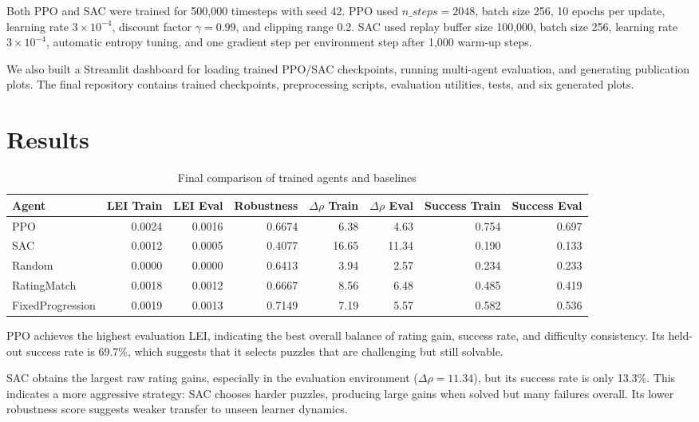 \documentclass[10pt,twocolumn]{article}
\begin{document}
Both PPO and SAC were trained for 500,000 timesteps with seed 42. PPO used
$n\_steps=2048$, batch size 256, 10 epochs per update, learning rate $3\times 10^{-4}$,
discount factor $\gamma=0.99$, and clipping range 0.2. SAC used replay buffer size
100,000, batch size 256, learning rate $3\times 10^{-4}$, automatic entropy tuning,
and one gradient step per environment step after 1,000 warm-up steps.

We also built a Streamlit dashboard for loading trained PPO/SAC checkpoints, running
multi-agent evaluation, and generating publication plots. The final repository
contains trained checkpoints, preprocessing scripts, evaluation utilities, tests, and
six generated plots.

\section{Results}

\begin{table}[t]
\centering
\caption{Final comparison of trained agents and baselines}
\begin{tabular}{lrrrrrrr}
\toprule
\textbf{Agent} &
\textbf{LEI Train} &
\textbf{LEI Eval} &
\textbf{Robustness} &
\textbf{$\Delta\rho$ Train} &
\textbf{$\Delta\rho$ Eval} &
\textbf{Success Train} &
\textbf{Success Eval} \\
\midrule
PPO & 0.0024 & 0.0016 & 0.6674 & 6.38 & 4.63 & 0.754 & 0.697 \\
SAC & 0.0012 & 0.0005 & 0.4077 & 16.65 & 11.34 & 0.190 & 0.133 \\
Random & 0.0000 & 0.0000 & 0.6413 & 3.94 & 2.57 & 0.234 & 0.233 \\
RatingMatch & 0.0018 & 0.0012 & 0.6667 & 8.56 & 6.48 & 0.485 & 0.419 \\
FixedProgression & 0.0019 & 0.0013 & 0.7149 & 7.19 & 5.57 & 0.582 & 0.536 \\
\bottomrule
\end{tabular}
\end{table}

PPO achieves the highest evaluation LEI, indicating the best overall balance of rating
gain, success rate, and difficulty consistency. Its held-out success rate is 69.7\%,
which suggests that it selects puzzles that are challenging but still solvable.

SAC obtains the largest raw rating gains, especially in the evaluation environment
($\Delta\rho=11.34$), but its success rate is only 13.3\%. This indicates a more
aggressive strategy: SAC chooses harder puzzles, producing large gains when solved but
many failures overall. Its lower robustness score suggests weaker transfer to unseen
learner dynamics.
\end{document}
